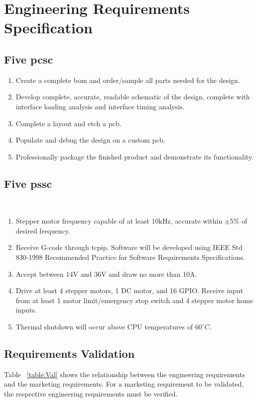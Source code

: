 \chapter{Engineering Requirements Specification}

\section{Five \gls{pcsc}}
\begin{enumerate}
	\item Create a complete \gls{bom} and order/sample all parts needed for the design.
	\item Develop complete, accurate, readable schematic of the design, complete with interface loading analysis and interface timing analysis. 
	\item Complete a layout and etch a \gls{pcb}.
	\item Populate and debug the design on a custom \gls{pcb}.
	\item Professionally package the finished product and demonstrate its functionality.
\end{enumerate}

\section{Five \gls{pssc}}\
\begin{enumerate}
	\item Stepper motor frequency capable of at least 10kHz, accurate within $\pm5\%$ of desired frequency.
	\item Receive G-code through \gls{tcpip}. Software will be developed using IEEE Std 830-1998 Recommended Practice for Software Requirements Specifications.
	\item Accept between 14V and 36V and draw no more than 10A.
	\item Drive at least 4 stepper motors, 1 DC motor, and 16 GPIO. Receive input from at least 1 motor limit/emergency stop switch and 4 stepper motor home inputs.
	\item Thermal shutdown will occur above CPU temperatures of $60^{\circ}C$.
\end{enumerate}

\section{Requirements Validation}
Table ~\ref{table:Val} shows the relationship between the engineering requirements and the marketing requirements.
For a marketing requirement to be validated, the respective engineering requirements must be verified.

